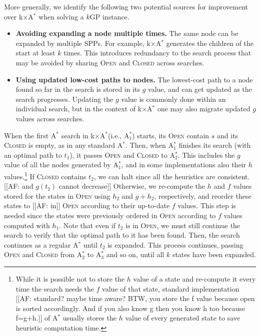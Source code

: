 \documentclass[twoside,11pt]{article}
\newcommand{\kgs}{$k$GP\xspace}
\newcommand{\astar}{A$^*$\xspace}
\newcommand{\kxastar}{k$\times$A$^*$\xspace}
\newcommand{\astari}[1]{A$^*_{#1}$\xspace}
\newcommand{\open}{\textsc{Open}\xspace}
\newcommand{\closed}{\textsc{Closed}\xspace}
\begin{document}
More generally, we identify the following two potential sources for improvement over \kxastar when solving a \kgs instance. 
\begin{itemize}
\item \textbf{Avoiding expanding a node multiple times.}
  The same node can be expanded by multiple \acp{SPP}.
  For example, \kxastar generates the children of the start at least $k$ times.
  This introduces redundancy to the search process that may be avoided by sharing \open and \closed across searches. 
  
\item \textbf{Using updated low-cost paths to nodes.}
  The lowest-cost path to a node found so far in the search is stored in its $g$ value, and can get updated as the search progresses. Updating the $g$ value is commonly done within an individual search, but in the context of \kxastar{} one may also migrate updated $g$ values across searches.
\end{itemize}




When the first \astar search in \kxastar (i.e., \astari{1}) starts, its \open contain $s$ and its \closed is empty, as in any standard \astar.
Then, when \astari{1} finishes its search (with an optimal path to $t_1$), it passes \open and \closed to \astari{2}.
This includes the $g$ value of all the nodes generated by \astari{1}, and in some implementations also their $h$ values.\footnote{While it is possible not to store the $h$ value of a state and re-compute it every time the search needs the $f$ value of that state, standard implementation [[AF: standard? maybe time aware? BTW, you store the f value because open is sorted accordingly. And if you also know g then you know h too because f=g+h.]] of \astar usually stores the $h$ value of every generated state to save heuristic computation time.} 
If \closed contains $t_2$, we can halt since all the heuristics are consistent.[[AF: and $g(t_2)$ cannot decrease]]
Otherwise, we re-compute the $h$ and $f$ values stored for the states in \open using $h_2$ and $g+h_2$, respectively, and reorder these states to [[AF: in]] \open according to their up-to-date $f$ values.
This step is needed since the states were previously ordered in \open according to $f$ values computed with $h_1$.
Note that even if $t_2$ is in \open, we must still continue the search to verify that the optimal path to it has been found.
Then, the search continues as a regular \astar until $t_2$ is expanded.
This process continues, passing \open and \closed from \astari{2} to \astari{3} and so on, until all $k$ states have been expanded.
\end{document}
